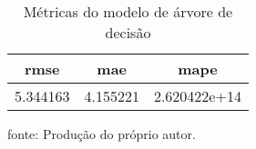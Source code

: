 \begin{table}
\centering
\caption{Métricas do modelo de árvore de decisão}
\label{tab:tree_metrics}
\begin{tabular}{ccc}
\toprule
    rmse &      mae &         mape \\
\midrule
5.344163 & 4.155221 & 2.620422e+14 \\
\bottomrule
\end{tabular}
\par
{\small fonte: Produção do próprio autor.}
\end{table}
